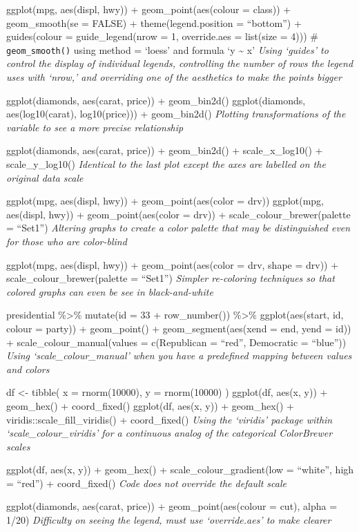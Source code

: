 \documentclass[
]{article}
\begin{document}
ggplot(mpg, aes(displ, hwy)) + geom\_point(aes(colour = class)) +
geom\_smooth(se = FALSE) + theme(legend.position = ``bottom'') +
guides(colour = guide\_legend(nrow = 1, override.aes = list(size = 4)))
\# \texttt{geom\_smooth()} using method = `loess' and formula `y
\textasciitilde{} x' \emph{Using `guides' to control the display of
individual legends, controlling the number of rows the legend uses with
`nrow,' and overriding one of the aesthetics to make the points bigger}

ggplot(diamonds, aes(carat, price)) + geom\_bin2d() ggplot(diamonds,
aes(log10(carat), log10(price))) + geom\_bin2d() \emph{Plotting
transformations of the variable to see a more precise relationship}

ggplot(diamonds, aes(carat, price)) + geom\_bin2d() + scale\_x\_log10()
+ scale\_y\_log10() \emph{Identical to the last plot except the axes are
labelled on the original data scale}

ggplot(mpg, aes(displ, hwy)) + geom\_point(aes(color = drv)) ggplot(mpg,
aes(displ, hwy)) + geom\_point(aes(color = drv)) +
scale\_colour\_brewer(palette = ``Set1'') \emph{Altering graphs to
create a color palette that may be distinguished even for those who are
color-blind}

ggplot(mpg, aes(displ, hwy)) + geom\_point(aes(color = drv, shape =
drv)) + scale\_colour\_brewer(palette = ``Set1'') \emph{Simpler
re-coloring techniques so that colored graphs can even be see in
black-and-white}

presidential \%\textgreater\% mutate(id = 33 + row\_number())
\%\textgreater\% ggplot(aes(start, id, colour = party)) + geom\_point()
+ geom\_segment(aes(xend = end, yend = id)) +
scale\_colour\_manual(values = c(Republican = ``red'', Democratic =
``blue'')) \emph{Using `scale\_colour\_manual' when you have a
predefined mapping between values and colors}

df \textless- tibble( x = rnorm(10000), y = rnorm(10000) ) ggplot(df,
aes(x, y)) + geom\_hex() + coord\_fixed() ggplot(df, aes(x, y)) +
geom\_hex() + viridis::scale\_fill\_viridis() + coord\_fixed()
\emph{Using the `viridis' package within `scale\_colour\_viridis' for a
continuous analog of the categorical ColorBrewer scales}

ggplot(df, aes(x, y)) + geom\_hex() + scale\_colour\_gradient(low =
``white'', high = ``red'') + coord\_fixed() \emph{Code does not override
the default scale}

ggplot(diamonds, aes(carat, price)) + geom\_point(aes(colour = cut),
alpha = 1/20) \emph{Difficulty on seeing the legend, must use
`override.aes' to make clearer}
\end{document}
